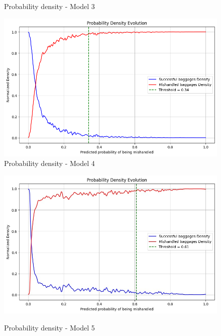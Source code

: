 \documentclass[12pt]{article}
\begin{document}
\begin{figure}
\begin{minipage}[c]{0.5\linewidth}
    \caption{Probability density - Model 3}
\end{minipage}
\hfill
\begin{minipage}[c]{0.5\linewidth}
    \includegraphics[width=1\textwidth]{Probability_density_Model 4.png}\\
    \caption{Probability density - Model 4}
\end{minipage}
\break
\begin{minipage}[c]{0.5\linewidth}
    \includegraphics[width=1\textwidth]{Probability_density_Model 5.jpg}\\
    \caption{Probability density - Model 5}
\end{minipage}
\hfill
\begin{minipage}[c]{0.5\linewidth}

\end{minipage}
\end{figure}
\end{document}
